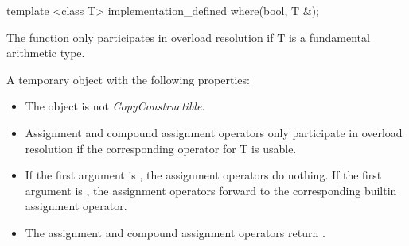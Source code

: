 \begin{itemdecl}
template <class T> implementation_defined where(bool, T &);
\end{itemdecl}
\begin{itemdescr}
  \pnum\remarks The function only participates in overload resolution if \type T is a fundamental arithmetic type.

  \pnum\returns A temporary object with the following properties:
  \begin{itemize}
    \item The object is not \textit{CopyConstructible}.
    \item Assignment and compound assignment operators only participate in overload resolution if the corresponding operator for \type T is usable.
    \item \effects If the first argument is \false, the assignment operators do nothing.
      If the first argument is \true, the assignment operators forward to the corresponding builtin assignment operator.
    \item The assignment and compound assignment operators return \void.
  \end{itemize}
\end{itemdescr}

